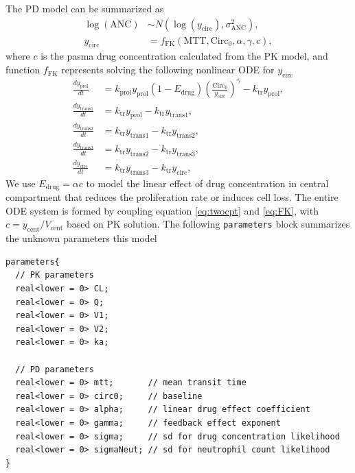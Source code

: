 The PD model can be summarized as
\begin{align*}
  \log(\text{ANC})& \sim N(\log(y_{\text{circ}}), \sigma^2_{\text{ANC}}),  \\
  y_{\text{circ}}& = f_{\text{FK}}(\text{MTT}, \text{Circ}_{0}, \alpha, \gamma, c),
\end{align*}
where \(c\) is the pasma drug concentration calculated from the PK model, and function $f_{\text{FK}}$ represents solving  the following
nonlinear ODE for $y_{\text{circ}}$ 
\begin{subequations}\label{eq:FK}
\begin{align}
  \frac{dy_\mathrm{prol}}{dt} &= k_\mathrm{prol} y_\mathrm{prol} (1 - E_\mathrm{drug})\left(\frac{\text{Circ}_0}{y_\mathrm{circ}}\right)^\gamma - k_\mathrm{tr}y_\mathrm{prol}, \\
  \frac{dy_\mathrm{trans1}}{dt} &= k_\mathrm{tr} y_\mathrm{prol} - k_\mathrm{tr} y_\mathrm{trans1}, \\
  \frac{dy_\mathrm{trans2}}{dt} &= k_\mathrm{tr} y_\mathrm{trans1} - k_\mathrm{tr} y_\mathrm{trans2},  \\
  \frac{dy_\mathrm{trans3}}{dt} &= k_\mathrm{tr} y_\mathrm{trans2} - k_\mathrm{tr} y_\mathrm{trans3},  \\
  \frac{dy_\mathrm{circ}}{dt} &= k_\mathrm{tr} y_\mathrm{trans3} - k_\mathrm{tr} y_\mathrm{circ},
\end{align}
\end{subequations}
We use $E_{\text{drug}} = \alpha c$ to model the linear effect of drug
concentration in central compartment that reduces the proliferation rate or induces cell loss. The entire ODE system is formed by coupling equation \eqref{eq:twocpt}
and \eqref{eq:FK}, with
$c=y_{\text{cent}}/V_{\text{cent}}$ based on PK solution.
The following \texttt{parameters} block summarizes the unknown parameters this model
\begin{lstlisting}[style=stan, numbers=none] 
parameters{
  // PK parameters
  real<lower = 0> CL;
  real<lower = 0> Q;
  real<lower = 0> V1;
  real<lower = 0> V2;
  real<lower = 0> ka;

  // PD parameters
  real<lower = 0> mtt;       // mean transit time
  real<lower = 0> circ0;     // baseline
  real<lower = 0> alpha;     // linear drug effect coefficient
  real<lower = 0> gamma;     // feedback effect exponent
  real<lower = 0> sigma;     // sd for drug concentration likelihood
  real<lower = 0> sigmaNeut; // sd for neutrophil count likelihood
}
\end{lstlisting}

